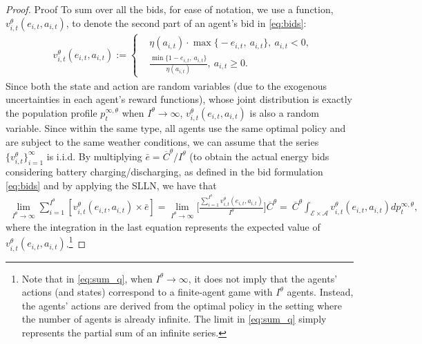 \documentclass{article}
\theoremstyle{definition}
\theoremstyle{plain}
\begin{document}
\begin{proof}{Proof}
To sum over all the bids, for ease of notation, we use a function,  $v^{\theta}_{i,t}(e_{i,t}, a_{i,t})$, to denote the second part of an agent's bid in \eqref{eq:bids}: 
\begin{align}\label{eq:v_function}
& v^{\theta}_{i,t}(e_{i,t}, a_{i,t}):= \left\{
\begin{aligned}
& \eta(a_{i,t}) \cdot \max \big\{- e_{i,t},\ a_{i,t} \big\}, \    a_{i,t} < 0,\\
&  \frac{\min \big\{1-e_{i,t},\ a_{i,t}\big\}}{\eta(a_{i,t})}, \ a_{i,t} \geq 0. 
\end{aligned}
\right.
\end{align}
Since both the state and action are random variables (due to the exogenous uncertainties in each agent's reward functions), whose joint distribution is exactly the population profile $p_t^{\infty,\theta}$ when $I^{\theta} \to \infty$,  $v^{\theta}_{i,t}(e_{i,t}, a_{i,t})$ is also a random variable. 
Since within the same type, all agents use the same optimal policy and are subject to the same weather conditions, we can assume that the series $\{v^{\theta}_{i,t}\}_{i=1}^{\infty}$ is i.i.d. By multiplying $\bar{e} = \overline{C}^{\theta}/{I^{\theta}}$ (to obtain the actual energy bids considering battery charging/discharging, as defined in the bid formulation \eqref{eq:bids} and by applying the SLLN, we have that 
\begin{equation}\label{eq:sum_v}
\begin{array}{l}
\displaystyle
\lim_{I^{\theta}\to \infty}\sum_{i=1}^{I^{\theta}} \left[v^{\theta}_{i,t}(e_{i,t}, a_{i,t}) \times   \bar{e}\right] = \lim_{I^{\theta}\to \infty}\Bigg[\frac{\displaystyle\sum_{i=1}^{I^{\theta}} v^{\theta}_{i,t}(e_{i,t},a_{i,t})}{I^{\theta}} \Bigg]\overline{C}^{\theta}  =  \ \overline{C}^{\theta}\int_{\mathcal{E}\times\mathcal{A}} v^{\theta}_{i,t}(e_{i,t},a_{i,t})dp_t^{\infty, \theta},  
\end{array}
\end{equation}
where the integration in the last equation represents the expected value of $v^{\theta}_{i,t}(e_{i,t},a_{i,t})$.\footnote{Note that in \eqref{eq:sum_q}, when \(I^{\theta} \to \infty\), it does not imply that the agents' actions (and states) correspond to a finite-agent game with \(I^{\theta}\) agents. Instead, the agents' actions are derived from the optimal policy in the setting where the number of agents is already infinite. The limit in \eqref{eq:sum_q} simply represents the partial sum of an infinite series.}


\end{proof}
\end{document}
